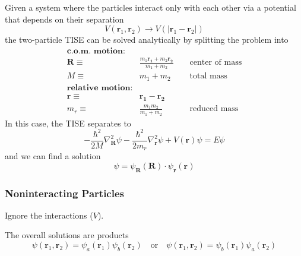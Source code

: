 Given a system where the particles interact only with each other via a potential that depends on their separation
\begin{equation*}
    V(\mathbf{r}_1,\mathbf{r}_2)\to V(|\mathbf{r}_1-\mathbf{r}_2|)
\end{equation*}
the two-particle TISE can be solved analytically by splitting the problem into
\noindent\begin{align*}
    \textbf{c.o.m. motion:}   &                                                                              \\
    \mathbf{R}\equiv\         & \frac{m_1\mathbf{r_1}+m_2\mathbf{r_2}}{m_1+m_2} &   & \text{ center of mass} \\
    M\equiv\                  & m_1 + m_2                                       &   & \text{ total mass}     \\
    \textbf{relative motion:} &                                                                              \\
    \mathbf{r}\equiv\         & \mathbf{r_1}-\mathbf{r_2}                       &                            \\
    m_r\equiv\                & \frac{m_1 m_2}{m_1+m_2}                         &   & \text{ reduced mass}
\end{align*}
In this case, the TISE separates to
\begin{equation*}
    -\frac{\hbar^{2}}{2M}\nabla_{\mathbf{R}}^{2}\psi-\frac{\hbar^{2}}{2m_r}\nabla_{\mathbf{r}}^{2}\psi+V(\mathbf{r})\psi=E\psi
\end{equation*}
and we can find a solution
\begin{equation*}
    \psi = \psi_\mathbf{R}(\mathbf{R})\cdot\psi_\mathbf{r}(\mathbf{r})
\end{equation*}

\subsubsection{Noninteracting Particles}
Ignore the interactions ($V$).
\newpar{}

The overall solutions are products
\begin{equation*}
    \psi(\mathbf{r}_{1},\mathbf{r}_{2} )=\psi_{a}(\mathbf{r}_{1})\psi_{b}(\mathbf{r}_{2}) \quad\text{or}\quad
    \psi(\mathbf{r}_{1},\mathbf{r}_{2}) =\psi_{b}(\mathbf{r}_{1})\psi_{a}(\mathbf{r}_{2})
\end{equation*}

\newpar{}

